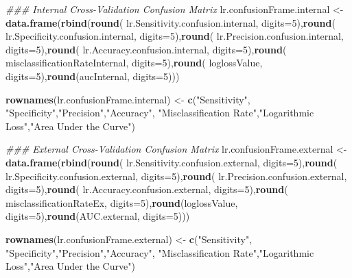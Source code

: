 \documentclass[american,]{article}
\newenvironment{Shaded}{\begin{snugshade}}{\end{snugshade}}
\newcommand{\CommentTok}[1]{\textcolor[rgb]{0.56,0.35,0.01}{\textit{#1}}}
\newcommand{\DataTypeTok}[1]{\textcolor[rgb]{0.13,0.29,0.53}{#1}}
\newcommand{\DecValTok}[1]{\textcolor[rgb]{0.00,0.00,0.81}{#1}}
\newcommand{\KeywordTok}[1]{\textcolor[rgb]{0.13,0.29,0.53}{\textbf{#1}}}
\newcommand{\NormalTok}[1]{#1}
\newcommand{\StringTok}[1]{\textcolor[rgb]{0.31,0.60,0.02}{#1}}
\begin{document}
\begin{Shaded}
\begin{Highlighting}[]
\CommentTok{### Internal Cross-Validation Confusion Matrix}
\NormalTok{lr.confusionFrame.internal <-}\StringTok{ }\KeywordTok{data.frame}\NormalTok{(}\KeywordTok{rbind}\NormalTok{(}\KeywordTok{round}\NormalTok{(}
\NormalTok{lr.Sensitivity.confusion.internal, }\DataTypeTok{digits=}\DecValTok{5}\NormalTok{),}\KeywordTok{round}\NormalTok{(}
\NormalTok{lr.Specificity.confusion.internal, }\DataTypeTok{digits=}\DecValTok{5}\NormalTok{),}\KeywordTok{round}\NormalTok{(}
\NormalTok{lr.Precision.confusion.internal, }\DataTypeTok{digits=}\DecValTok{5}\NormalTok{),}\KeywordTok{round}\NormalTok{(}
\NormalTok{lr.Accuracy.confusion.internal, }\DataTypeTok{digits=}\DecValTok{5}\NormalTok{),}\KeywordTok{round}\NormalTok{(}
\NormalTok{misclassificationRateInternal, }\DataTypeTok{digits=}\DecValTok{5}\NormalTok{),}\KeywordTok{round}\NormalTok{(}
\NormalTok{loglossValue, }\DataTypeTok{digits=}\DecValTok{5}\NormalTok{),}\KeywordTok{round}\NormalTok{(aucInternal, }\DataTypeTok{digits=}\DecValTok{5}\NormalTok{)))}

\KeywordTok{rownames}\NormalTok{(lr.confusionFrame.internal) <-}\StringTok{ }\KeywordTok{c}\NormalTok{(}\StringTok{"Sensitivity"}\NormalTok{,}
\StringTok{"Specificity"}\NormalTok{,}\StringTok{"Precision"}\NormalTok{,}\StringTok{"Accuracy"}\NormalTok{,}
\StringTok{"Misclassification Rate"}\NormalTok{,}\StringTok{"Logarithmic Loss"}\NormalTok{,}\StringTok{"Area Under the Curve"}\NormalTok{)}

\CommentTok{### External Cross-Validation Confusion Matrix}
\NormalTok{lr.confusionFrame.external <-}\StringTok{ }\KeywordTok{data.frame}\NormalTok{(}\KeywordTok{rbind}\NormalTok{(}\KeywordTok{round}\NormalTok{(}
\NormalTok{lr.Sensitivity.confusion.external, }\DataTypeTok{digits=}\DecValTok{5}\NormalTok{),}\KeywordTok{round}\NormalTok{(}
\NormalTok{lr.Specificity.confusion.external, }\DataTypeTok{digits=}\DecValTok{5}\NormalTok{),}\KeywordTok{round}\NormalTok{(}
\NormalTok{lr.Precision.confusion.external, }\DataTypeTok{digits=}\DecValTok{5}\NormalTok{),}\KeywordTok{round}\NormalTok{(}
\NormalTok{lr.Accuracy.confusion.external, }\DataTypeTok{digits=}\DecValTok{5}\NormalTok{),}\KeywordTok{round}\NormalTok{(}
\NormalTok{misclassificationRateEx, }\DataTypeTok{digits=}\DecValTok{5}\NormalTok{),}\KeywordTok{round}\NormalTok{(loglossValue, }
\DataTypeTok{digits=}\DecValTok{5}\NormalTok{),}\KeywordTok{round}\NormalTok{(AUC.external, }\DataTypeTok{digits=}\DecValTok{5}\NormalTok{)))}

\KeywordTok{rownames}\NormalTok{(lr.confusionFrame.external) <-}\StringTok{ }\KeywordTok{c}\NormalTok{(}\StringTok{"Sensitivity"}\NormalTok{,}
\StringTok{"Specificity"}\NormalTok{,}\StringTok{"Precision"}\NormalTok{,}\StringTok{"Accuracy"}\NormalTok{,}
\StringTok{"Misclassification Rate"}\NormalTok{,}\StringTok{"Logarithmic Loss"}\NormalTok{,}\StringTok{"Area Under the Curve"}\NormalTok{)}


\end{Highlighting}
\end{Shaded}
\end{document}
